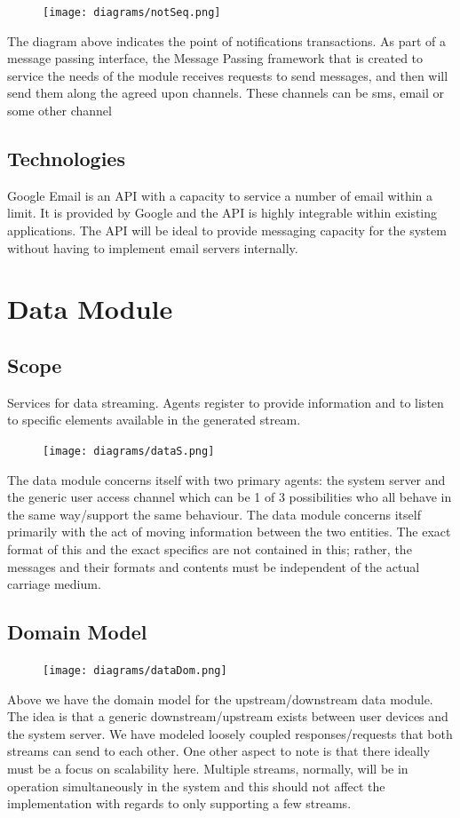 \documentclass[12pt]{article}
\begin{document}
\begin{figure}
\centering
\texttt{[image: diagrams/notSeq.png]}
\end{figure}
The diagram above indicates the point of notifications transactions. As part of a message passing interface, the Message Passing framework that is created to service the needs of the module receives requests to send messages, and then will send them along the agreed upon channels. These channels can be sms, email or some other channel
\subsection{Technologies}
Google Email is an API with a capacity to service a number of email within a limit. It is provided by Google and the API is highly integrable within existing applications. The API will be ideal to provide messaging capacity for the system without having to implement email servers internally.

\section{Data Module}
\subsection{Scope}
Services for data streaming. Agents register to provide information and to listen to specific elements available in the generated stream.

\begin{figure}[h]
\centering
\texttt{[image: diagrams/dataS.png]}
\end{figure}
The data module concerns itself with two primary agents: the system server and the generic user access channel which can be 1 of 3 possibilities who all behave in the same way/support the same behaviour. The data module concerns itself primarily with the act of moving information between the two entities. The exact format of this and the exact specifics are not contained in this; rather, the messages and their formats and contents must be independent of the actual carriage medium. 

\subsection{Domain Model}
\begin{figure}[h]
\centering
\texttt{[image: diagrams/dataDom.png]}

\end{figure}
Above we have the domain model for the upstream/downstream data module. The idea is that a generic downstream/upstream exists between user devices and the system server. We have modeled loosely coupled responses/requests that both streams can send to each other. One other aspect to note is that there ideally must be a focus on scalability here. Multiple streams, normally, will be in operation simultaneously in the system and this should not affect the implementation with regards to only supporting a few streams.
\end{document}
